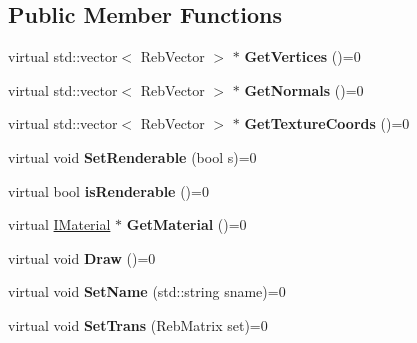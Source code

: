 \subsection*{Public Member Functions}
\begin{DoxyCompactItemize}
\item 
virtual std\+::vector$<$ Reb\+Vector $>$ $\ast$ {\bfseries Get\+Vertices} ()=0\hypertarget{class_i_vertex_buffer_ac3ebbfc832e42aeb21afa54f636f4945}{}\label{class_i_vertex_buffer_ac3ebbfc832e42aeb21afa54f636f4945}

\item 
virtual std\+::vector$<$ Reb\+Vector $>$ $\ast$ {\bfseries Get\+Normals} ()=0\hypertarget{class_i_vertex_buffer_adec6f810ef964c3043023cabaa6a9875}{}\label{class_i_vertex_buffer_adec6f810ef964c3043023cabaa6a9875}

\item 
virtual std\+::vector$<$ Reb\+Vector $>$ $\ast$ {\bfseries Get\+Texture\+Coords} ()=0\hypertarget{class_i_vertex_buffer_a6a1376c2473d0863d23c7a28ff664c32}{}\label{class_i_vertex_buffer_a6a1376c2473d0863d23c7a28ff664c32}

\item 
virtual void {\bfseries Set\+Renderable} (bool s)=0\hypertarget{class_i_vertex_buffer_a1a56478b0998b0ccd6d3f10f1231ac06}{}\label{class_i_vertex_buffer_a1a56478b0998b0ccd6d3f10f1231ac06}

\item 
virtual bool {\bfseries is\+Renderable} ()=0\hypertarget{class_i_vertex_buffer_a46768c41e96e5815cf932d2c9979a970}{}\label{class_i_vertex_buffer_a46768c41e96e5815cf932d2c9979a970}

\item 
virtual \hyperlink{class_i_material}{I\+Material} $\ast$ {\bfseries Get\+Material} ()=0\hypertarget{class_i_vertex_buffer_ae3632b82fc09404a9e09a520d6da4d5d}{}\label{class_i_vertex_buffer_ae3632b82fc09404a9e09a520d6da4d5d}

\item 
virtual void {\bfseries Draw} ()=0\hypertarget{class_i_vertex_buffer_ae8e72db479d6cbe32620307f58babb6a}{}\label{class_i_vertex_buffer_ae8e72db479d6cbe32620307f58babb6a}

\item 
virtual void {\bfseries Set\+Name} (std\+::string sname)=0\hypertarget{class_i_vertex_buffer_ad0b387d86e6ed76df6684c60c4ae43da}{}\label{class_i_vertex_buffer_ad0b387d86e6ed76df6684c60c4ae43da}

\item 
virtual void {\bfseries Set\+Trans} (Reb\+Matrix set)=0\hypertarget{class_i_vertex_buffer_acd36b826ab021f1271ff34f87b55fd45}{}\label{class_i_vertex_buffer_acd36b826ab021f1271ff34f87b55fd45}


\end{DoxyCompactItemize}

